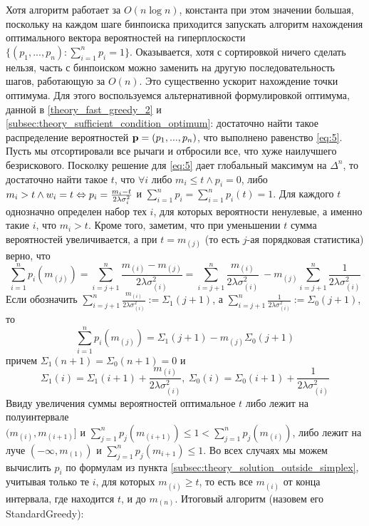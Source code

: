 Хотя алгоритм работает за $O (n \log n)$, константа при этом значении большая, поскольку на каждом шаге бинпоиска приходится запускать алгоритм нахождения оптимального вектора вероятностей на гиперплоскости $\{(p_1, ..., p_n) : \sum_{i=1}^n p_i = 1 \}$. Оказывается, хотя с сортировкой ничего сделать нельзя, часть с бинпоиском можно заменить на другую последовательность шагов, работающую за $O(n)$. Это существенно ускорит нахождение точки оптимума. Для этого воспользуемся альтернативной формулировкой оптимума, данной в \ref{theory_fast_greedy_2} и \ref{subsec:theory_sufficient_condition_optimum}: достаточно найти такое распределение вероятностей $\textbf{p}=(p_1,...,p_n)$, что выполнено равенство \ref{eq:5}. Пусть мы отсортировали все рычаги и отбросили все, что хуже наилучшего безрискового. Посколку решение для \ref{eq:5} дает глобальный максимум на $\Delta^n$, то достаточно найти такое $t$, что $\forall i$ либо $m_i \leq t \land p_i = 0$, либо $m_i > t \land w_i = t \Leftrightarrow p_i = \frac{m_i - t}{2\lambda \sigma_i^2}$ и $\sum_{i=1}^n p_i = \sum_{i=1}^n p_i(t) = 1$. Для каждого $t$ однозначно определен набор тех $i$, для которых вероятности ненулевые, а именно такие $i$, что $m_i > t$. Кроме того, заметим, что при уменьшении $t$ сумма вероятностей увеличивается, а при $t = m_{(j)}$ (то есть $j$-ая порядковая статистика) верно, что 
\[
\sum_{i=1}^n p_i(m_{(j)}) = \sum_{i=j+1}^n \frac{m_{(i)} - m_{(j)}}{2 \lambda \sigma_{(i)}^2} = \sum_{i=j+1}^n \frac{m_{(i)}}{2 \lambda \sigma_{(i)}^2} \: - m_{(j)} \sum_{i=j+1}^n \frac{1}{2 \lambda \sigma_{(i)}^2}
\]
Если обозначить $\sum_{i=j+1}^n \frac{m_{(i)}}{2 \lambda \sigma_{(i)}^2} := \Sigma_1(j+1)$, а $\sum_{i=j+1}^n \frac{1}{2 \lambda \sigma_{(i)}^2} := \Sigma_0(j+1)$, то 
\[
\label{eq:fast}
\sum_{i=1}^n p_i(m_{(j)}) = \Sigma_1(j+1) - m_{(j)} \Sigma_0(j+1)
\]
причем $\Sigma_1(n+1) = \Sigma_0(n+1) = 0$ и $$\Sigma_1(i) = \Sigma_1(i+1) + \frac{m_{(i)}}{2\lambda \sigma_{(i)}^2}, \: \Sigma_0(i) = \Sigma_0(i+1) + \frac{1}{2\lambda \sigma_{(i)}^2}$$
Ввиду увеличения суммы вероятностей оптимальное $t$ либо лежит на полуинтервале \\ $(m_{(i)}, m_{(i+1)}]$ и $\sum_{j=1}^n p_j (m_{(i+1)}) \leq 1 < \sum_{j=1}^n p_j (m_{(i)})$, либо лежит на луче $(-\infty, m_{(1)})$ и $\sum_{j=1}^n p_j (m_{i+1}) \leq 1$. Во всех случаях мы можем вычислить $p_i$ по формулам из пункта \ref{subsec:theory_solution_outside_simplex}, учитывая только те $i$, для которых $m_{(i)} \geq t$, то есть все $m_{(i)}$ от конца интервала, где находится $t$, и до $m_{(n)}$. Итоговый алгоритм (назовем его StandardGreedy):
